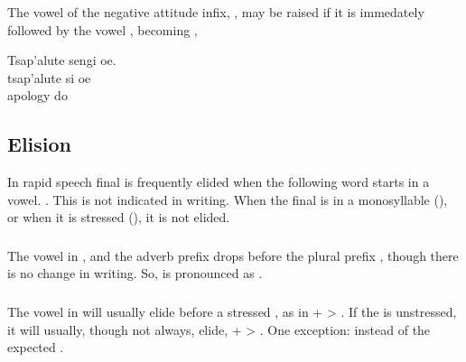 \subsubsection{}\label{l-and-s:eng}
The vowel of the negative attitude infix, , may be raised
if it is immedately followed by the vowel , becoming ,

\begin{interlin}
\glll Tsap'alute sengi oe. \\
      tsap'alute si oe \\
      apology do  \\
\end{interlin}


\subsection{Elision} In rapid speech final  is frequently elided
when the following word starts in a vowel.  .  This is not indicated in writing.
When the final  is in a monosyllable (), or when it is
stressed (), it is not elided.

\subsubsection{} The vowel  in ,  and the adverb
prefix  drops before the plural prefix , though there is
no change in writing.  So,   is pronounced as
. \label{l-and-s:elision-i}

\subsubsection{} The vowel in  will usually elide before a
stressed , as in  +  > . If the 
is unstressed, it will usually, though not always, elide,  +
 > . One exception:  instead of the
expected .

